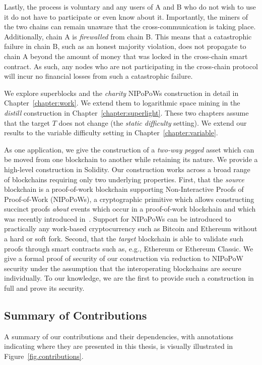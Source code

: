 Lastly, the process is voluntary and any users of A and B who do not wish to use
it do not have to participate or even know about it. Importantly, the miners of
the two chains can remain unaware that the cross-communication is taking place.
Additionally, chain A is \emph{firewalled} from chain B. This means that a
catastrophic failure in chain B, such as an honest majority violation, does not
propagate to chain A beyond the amount of money that was locked in the
cross-chain smart contract. As such, any nodes who are not participating in the
cross-chain protocol will incur no financial losses from such a catastrophic
failure.

\ifdraft
We explore superblocks and the \emph{charity} NIPoPoWs construction in detail in
Chapter~\ref{chapter:work}. We extend them to logarithmic space mining in the
\emph{distill} construction in Chapter~\ref{chapter:superlight}. These two
chapters assume that the target $T$ does not change (the
\emph{static difficulty} setting). We extend our results to the variable
difficulty setting in Chapter~\ref{chapter:variable}.
\fi


\ifdraft
{}
As one application, we give the
construction of a \emph{two-way pegged} asset which can be moved from one
blockchain to another while retaining its nature. We provide a high-level
construction in Solidity. Our construction works across a broad range of
blockchains requiring only two underlying properties. First, that the
\emph{source} blockchain is a proof-of-work blockchain supporting
Non-Interactive Proofs of Proof-of-Work (NIPoPoWs), a cryptographic primitive
which allows constructing succinct proofs \emph{about} events which occur in a
proof-of-work blockchain and which was recently introduced in~\cite{nipopows}.
Support for NIPoPoWs can be introduced to practically any
work-based cryptocurrency such as Bitcoin and Ethereum without a hard or soft
fork. Second, that the \emph{target} blockchain is able to validate such proofs
through smart contracts such as, e.g., Ethereum or Ethereum
Classic.
We give a formal proof of security of our construction via
reduction to NIPoPoW security under the assumption that the interoperating
blockchains are secure individually.
To our knowledge, we are the first to
provide such a construction in
full and prove its security.
\fi

\subsection{Summary of Contributions}
A summary of our contributions and their dependencies, with annotations
indicating where they are presented in this thesis, is visually illustrated in
Figure~\ref{fig.contributions}.


